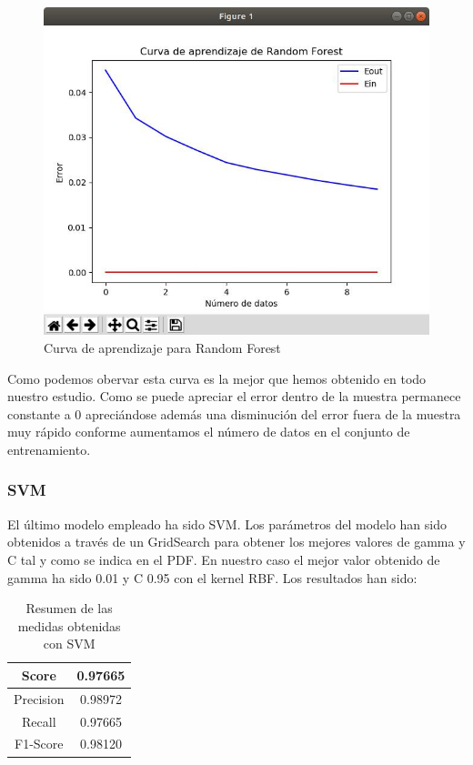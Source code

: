 \begin{figure}[H] %
	\centering
	\includegraphics[scale=0.6]{aprendizaje-random-forest.jpg}  %
	\caption{Curva de aprendizaje para Random Forest} 
	\label{fig:aprendizaje-random-forest}
\end{figure}

Como podemos obervar esta curva es la mejor que hemos obtenido en todo nuestro estudio. Como se puede apreciar el error dentro de la muestra permanece constante a 0 apreciándose además una disminución del error fuera de la muestra muy rápido conforme aumentamos el número de datos en el conjunto de entrenamiento.

\subsubsection{SVM}

El último modelo empleado ha sido SVM. Los parámetros del modelo han sido obtenidos a través de un GridSearch para obtener los mejores valores de gamma y C tal y como se indica en el PDF. En nuestro caso el mejor valor obtenido de gamma ha sido 0.01 y C 0.95 con el kernel RBF. Los resultados han sido:

\begin{table}[H]
	\centering
	\begin{tabular}{|c|c|}
		\hline
		Score     & 0.97665   \\ \hline
		Precision & 0.98972  \\ \hline
		Recall    & 0.97665   \\ \hline
		F1-Score  & 0.98120 \\ \hline
	\end{tabular}
	\caption{Resumen de las medidas obtenidas con SVM}
\end{table}


